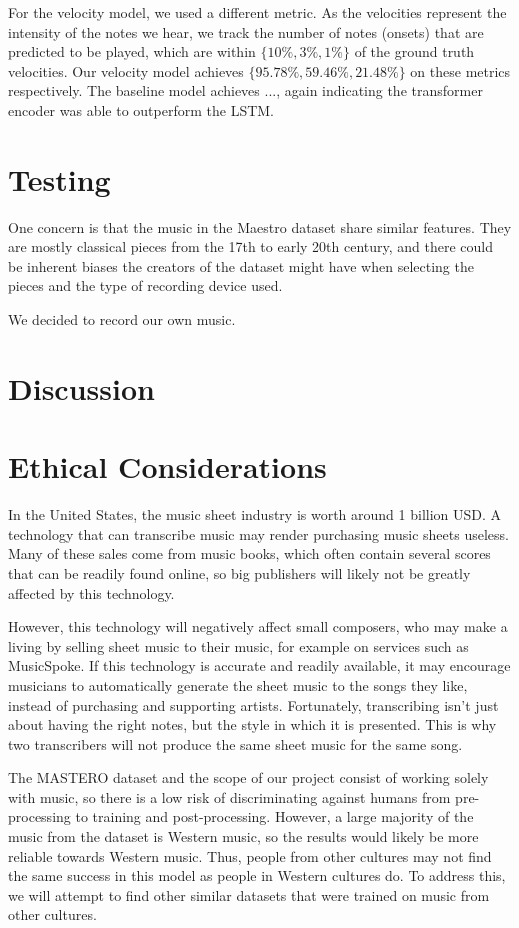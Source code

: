 \documentclass[a4paper,twocolumn,10pt]{article}
\begin{document}
For the velocity model, we used a different metric. As the velocities represent the intensity of the notes we hear, we track the number of notes (onsets) that are predicted to be played, which are within \(\{10\%, 3\%, 1\%\}\) of the ground truth velocities. Our velocity model achieves \(\{95.78\%, 59.46\%, 21.48\%\}\) on these metrics respectively. The baseline model achieves ..., again indicating the transformer encoder was able to outperform the LSTM.

\section{Testing}
One concern is that the music in the Maestro dataset share similar features. They are mostly classical pieces from the 17th to early 20th century\cite{maestro}, and there could be inherent biases the creators of the dataset might have when selecting the pieces and the type of recording device used.

We decided to record our own music.


\section{Discussion}
\section{Ethical Considerations}
In the United States, the music sheet industry is worth around 1 billion USD\cite{musicspoke}. A technology that can transcribe music may render purchasing music sheets useless. Many of these sales come from music books, which often contain several scores that can be readily found online, so big publishers will likely not be greatly affected by this technology.

However, this technology will negatively affect small composers, who may make a living by selling sheet music to their music, for example on services such as MusicSpoke\cite{musicspoke}. If this technology is accurate and readily available, it may encourage musicians to automatically generate the sheet music to the songs they like, instead of purchasing and supporting artists. Fortunately, transcribing isn’t just about having the right notes, but the style in which it is presented. This is why two transcribers will not produce the same sheet music for the same song.

The MASTERO dataset and the scope of our project consist of working solely with music, so there is a low risk of discriminating against humans from pre-processing to training and post-processing. However, a large majority of the music from the dataset is Western music, so the results would likely be more reliable towards Western music. Thus, people from other cultures may not find the same success in this model as people in Western cultures do. To address this, we will attempt to find other similar datasets that were trained on music from other cultures.
\printbibliography
\end{document}
